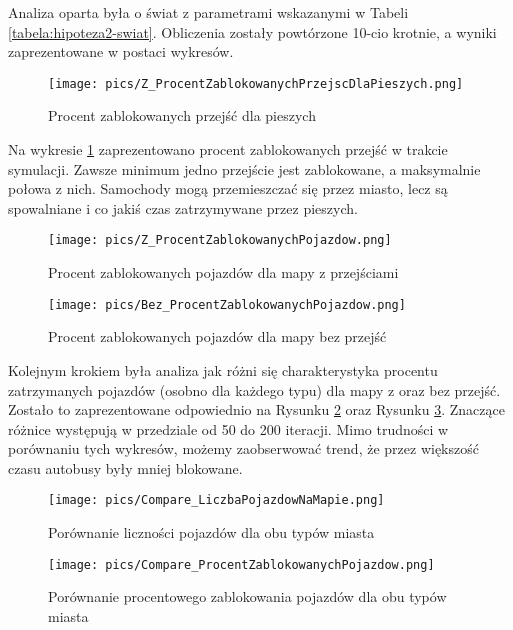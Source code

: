 \documentclass{article}
\begin{document}
Analiza oparta była o świat z parametrami wskazanymi w Tabeli \ref{tabela:hipoteza2-swiat}. Obliczenia zostały powtórzone 10-cio krotnie, a wyniki zaprezentowane w postaci wykresów.

\begin{figure}[!h]
\centering
    \texttt{[image: pics/Z\_ProcentZablokowanychPrzejscDlaPieszych.png]}
    \caption{Procent zablokowanych przejść dla pieszych}
    \label{fig:procent-zablokowanych-przejsc}
\end{figure}

Na wykresie \ref{fig:procent-zablokowanych-przejsc} zaprezentowano procent zablokowanych przejść w trakcie symulacji. Zawsze minimum jedno przejście jest zablokowane, a maksymalnie połowa z nich. Samochody mogą przemieszczać się przez miasto, lecz są spowalniane i co jakiś czas zatrzymywane przez pieszych.

\begin{figure}[!h]
\centering
    \texttt{[image: pics/Z\_ProcentZablokowanychPojazdow.png]}
    \caption{Procent zablokowanych pojazdów dla mapy z przejściami}
    \label{fig:procent-zablokowanych-pojazdow-z-przejsciami}
\end{figure}

\begin{figure}[!h]
\centering
    \texttt{[image: pics/Bez\_ProcentZablokowanychPojazdow.png]}
    \caption{Procent zablokowanych pojazdów dla mapy bez przejść}
    \label{fig:procent-zablokowanych-pojazdow-bez}
\end{figure}

Kolejnym krokiem była analiza jak różni się charakterystyka procentu zatrzymanych pojazdów (osobno dla każdego typu) dla mapy z oraz bez przejść. Zostało to zaprezentowane odpowiednio na Rysunku \ref{fig:procent-zablokowanych-pojazdow-z-przejsciami} oraz Rysunku \ref{fig:procent-zablokowanych-pojazdow-bez}. Znaczące różnice występują w przedziale od 50 do 200 iteracji. Mimo trudności w porównaniu tych wykresów, możemy zaobserwować trend, że przez większość czasu autobusy były mniej blokowane.

\begin{figure}[!h]
\centering
    \texttt{[image: pics/Compare\_LiczbaPojazdowNaMapie.png]}
    \caption{Porównanie liczności pojazdów dla obu typów miasta}
    \label{fig:porownanie-licznosci-pojazdow}
\end{figure}

\begin{figure}[!h]
\centering
    \texttt{[image: pics/Compare\_ProcentZablokowanychPojazdow.png]}
    \caption{Porównanie procentowego zablokowania pojazdów dla obu typów miasta}
    \label{fig:porownanie-zablokowane-pojazdy}
\end{figure}
\end{document}
